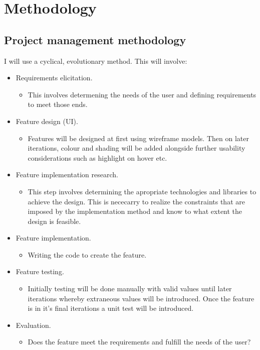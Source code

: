 \chapter{Methodology}
\label{methodology}

\section{Project management methodology}
I will use a cyclical, evolutionary method. This will involve:
\begin{itemize}
  \item Requirements elicitation.
  \begin{itemize}
    \item This involves determening the needs of the user and defining requirements to meet those ends.
  \end{itemize}
  \item Feature design (UI).
  \begin{itemize}
    \item Features will be designed at first using wireframe models. Then on later iterations, colour and shading will be added alongside further usability considerations such as highlight on hover etc.
  \end{itemize}
  \item Feature implementation research.
  \begin{itemize}
    \item This step involves determining the apropriate technologies and libraries to achieve the design. This is nececarry to realize the constraints that are imposed by the implementation method and know to what extent the design is feasible.
  \end{itemize}
  \item Feature implementation.
  \begin{itemize}
    \item Writing the code to create the feature.
  \end{itemize}
  \item Feature testing.
  \begin{itemize}
    \item Initially testing will be done manually with valid values until later iterations whereby extraneous values will be introduced. Once the feature is in it's final iterations a unit test will be introduced.
  \end{itemize}
  \item Evaluation.
  \begin{itemize}
    \item Does the feature meet the requirements and fulfill the needs of the user?
  \end{itemize}
\end{itemize}

